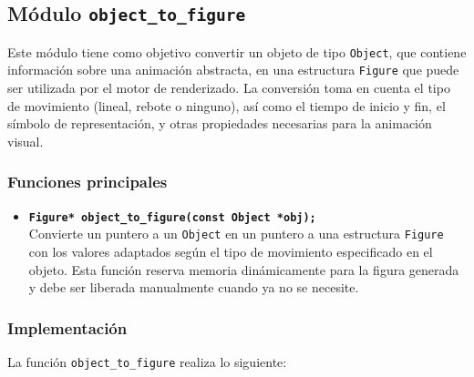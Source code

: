 \documentclass[12pt]{article}
\begin{document}
\subsection{Módulo \texttt{object\_to\_figure}}


Este módulo tiene como objetivo convertir un objeto de tipo \texttt{Object}, que contiene información sobre una animación abstracta, en una estructura \texttt{Figure} que puede ser utilizada por el motor de renderizado. La conversión toma en cuenta el tipo de movimiento (lineal, rebote o ninguno), así como el tiempo de inicio y fin, el símbolo de representación, y otras propiedades necesarias para la animación visual.



\subsubsection*{Funciones principales}

\begin{itemize}
  \item \textbf{\texttt{Figure* object\_to\_figure(const Object *obj);}}\\
  Convierte un puntero a un \texttt{Object} en un puntero a una estructura \texttt{Figure} con los valores adaptados según el tipo de movimiento especificado en el objeto. Esta función reserva memoria dinámicamente para la figura generada y debe ser liberada manualmente cuando ya no se necesite.
\end{itemize}

\subsubsection*{Implementación}

La función \texttt{object\_to\_figure} realiza lo siguiente:
\end{document}
